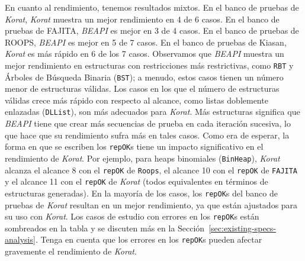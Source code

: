 En cuanto al rendimiento, tenemos resultados mixtos. En el banco de pruebas de \emph{Korat}, \emph{Korat} muestra un mejor rendimiento en 4 de 6 casos. En el banco de pruebas de \textsf{FAJITA}, \emph{BEAPI} es mejor en 3 de 4 casos. En el banco de pruebas de \textsf{ROOPS}, \emph{BEAPI} es mejor en 5 de 7 casos. En el banco de pruebas de \textsf{Kiasan}, \emph{Korat} es más rápido en 6 de los 7 casos. Observamos que \emph{BEAPI} muestra un mejor rendimiento en estructuras con restricciones más restrictivas, como \texttt{RBT} y Árboles de Búsqueda Binaria (\texttt{BST}); a menudo, estos casos tienen un número menor de estructuras válidas. Los casos en los que el número de estructuras válidas crece más rápido con respecto al alcance, como listas doblemente enlazadas (\texttt{DLList}), son más adecuados para \emph{Korat}. Más estructuras significa que \emph{BEAPI} tiene que crear más secuencias de prueba en cada iteración sucesiva, lo que hace que su rendimiento sufra más en tales casos. Como era de esperar, la forma en que se escriben los \texttt{repOK}s tiene un impacto significativo en el rendimiento de \emph{Korat}. Por ejemplo, para heaps binomiales (\texttt{BinHeap}), \emph{Korat} alcanza el alcance 8 con el \texttt{repOK} de \texttt{Roops}, el alcance 10 con el \texttt{repOK} de \texttt{FAJITA} y el alcance 11 con el \texttt{repOK} de \emph{Korat} (todos equivalentes en términos de estructuras generadas). En la mayoría de los casos, los \texttt{repOK}s del banco de pruebas de \emph{Korat} resultan en un mejor rendimiento, ya que están ajustados para su uso con \emph{Korat}. Los casos de estudio con errores en los \texttt{repOK}s están sombreados en la tabla y se discuten más en la Sección~\ref{sec:existing-specs-analysis}. Tenga en cuenta que los errores en los \texttt{repOK}s pueden afectar gravemente el rendimiento de \emph{Korat}.

